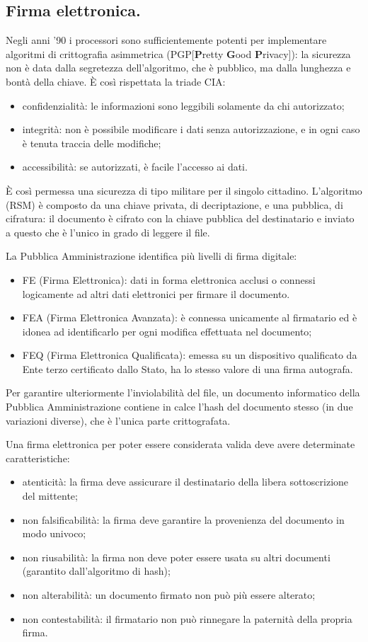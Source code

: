 \documentclass[a4page, 11pt, twocolumn]{article}
\begin{document}
\subsection{Firma elettronica.}
Negli anni '90 i processori sono sufficientemente potenti per implementare algoritmi di crittografia asimmetrica (PGP[\textbf{P}retty \textbf{G}ood\textbf{ P}rivacy]): la sicurezza non è data dalla segretezza dell'algoritmo, che è pubblico, ma dalla lunghezza e bontà della chiave.
È così rispettata la triade CIA:
\begin{itemize}
\item confidenzialità: le informazioni sono leggibili solamente da chi autorizzato;
\item integrità: non è possibile modificare i dati senza autorizzazione, e in ogni caso è tenuta traccia delle modifiche;
\item accessibilità: se autorizzati, è facile l'accesso ai dati.
\end{itemize}
È così permessa una sicurezza di tipo militare per il singolo cittadino.
L'algoritmo (RSM) è composto da una chiave privata, di decriptazione, e una pubblica, di cifratura: il documento è cifrato con la chiave pubblica del destinatario e inviato a questo che è l'unico in grado di leggere il file.

La Pubblica Amministrazione identifica più livelli di firma digitale:
\begin{itemize}
\item FE (Firma Elettronica): dati in forma elettronica acclusi o connessi logicamente ad altri dati elettronici per firmare il documento.
\item FEA (Firma Elettronica Avanzata): è connessa unicamente al firmatario ed è idonea ad identificarlo per ogni modifica effettuata nel documento;
\item FEQ (Firma Elettronica Qualificata): emessa su un dispositivo qualificato da Ente terzo certificato dallo Stato, ha lo stesso valore di una firma autografa.
\end{itemize}
Per garantire ulteriormente l'inviolabilità del file, un documento informatico della Pubblica Amministrazione contiene in calce l'hash del documento stesso (in due variazioni diverse), che è l'unica parte crittografata.

Una firma elettronica per poter essere considerata valida deve avere determinate caratteristiche:
\begin{itemize}
\item atenticità: la firma deve assicurare il destinatario della libera sottoscrizione del mittente;
\item non falsificabilità: la firma deve garantire la provenienza del documento in modo univoco;
\item non riusabilità: la firma non deve poter essere usata su altri documenti (garantito dall'algoritmo di hash);
\item non alterabilità: un documento firmato non può più essere alterato;
\item non contestabilità: il firmatario non può rinnegare la paternità della propria firma.
\end{itemize}
\end{document}
